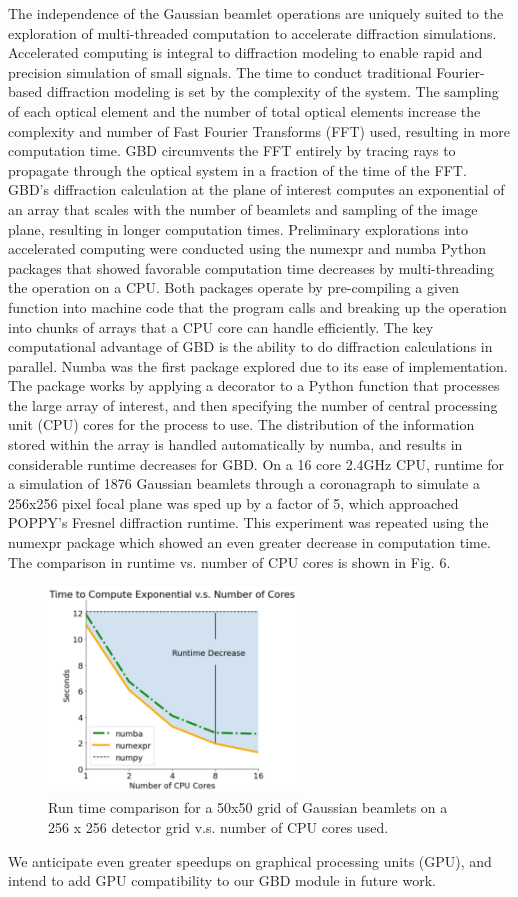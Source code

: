 The independence of the Gaussian beamlet operations are uniquely suited to the exploration of multi-threaded computation to accelerate diffraction simulations. Accelerated computing is integral to diffraction modeling to enable rapid and precision simulation of small signals. 
The time to conduct traditional Fourier-based diffraction modeling is set by the complexity of the system. The sampling of each optical element and the number of total optical elements increase the complexity and number of Fast Fourier Transforms (FFT) used, resulting in more computation time. GBD circumvents the FFT entirely by tracing rays to propagate through the optical system in a fraction of the time of the FFT. GBD’s diffraction calculation at the plane of interest computes an exponential of an array that scales with the number of beamlets and sampling of the image plane, resulting in longer computation times.  Preliminary explorations into accelerated computing were conducted using the numexpr\cite{numexpr} and numba\cite{lam_numba_2015} Python packages that showed favorable computation time decreases by multi-threading the operation on a CPU. Both packages operate by pre-compiling a given function into machine code that the program calls and breaking up the operation into chunks of arrays that a CPU core can handle efficiently. The key computational advantage of GBD is the ability to do diffraction calculations in parallel. Numba was the first package explored due to its ease of implementation. The package works by applying a decorator to a Python function that processes the large array of interest, and then specifying the number of central processing unit (CPU) cores for the process to use. The distribution of the information stored within the array is handled automatically by numba, and results in considerable runtime decreases for GBD. On a 16 core 2.4GHz CPU, runtime for a simulation of 1876 Gaussian beamlets through a coronagraph to simulate a 256x256 pixel focal plane was sped up by a factor of 5, which approached POPPY's Fresnel diffraction runtime. This experiment was repeated using the numexpr package which showed an even greater decrease in computation time. The comparison in runtime vs. number of CPU cores is shown in Fig. 6.

\begin{figure}[H]
    \centering
    \includegraphics[width=0.6\textwidth]{runtime.png}
    \caption{Run time comparison for a 50x50 grid of Gaussian beamlets on a 256 x 256 detector grid v.s. number of CPU cores used. }
    \label{fig:runtime_sim}
\end{figure}

We anticipate even greater speedups on graphical processing units (GPU), and intend to add GPU compatibility to our GBD module in future work.